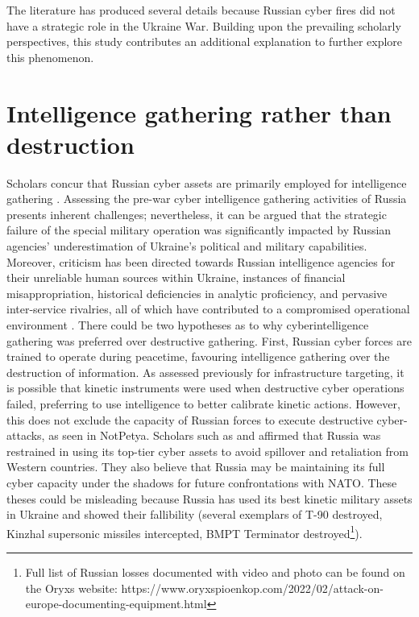 The literature has produced several details because Russian cyber fires did not have a strategic role in the Ukraine War. Building upon the prevailing scholarly perspectives, this study contributes an additional explanation to further explore this phenomenon.

\section{Intelligence gathering rather than destruction}

Scholars concur that Russian cyber assets are primarily employed for intelligence gathering \parencite{baetman_2022_russias, levite_2023_integrating, beecroft_2022_evaluating, lin_2022_russian}. Assessing the pre-war cyber intelligence gathering activities of Russia presents inherent challenges; nevertheless, it can be argued that the strategic failure of the special military operation was significantly impacted by Russian agencies' underestimation of Ukraine's political and military capabilities. Moreover, criticism has been directed towards Russian intelligence agencies for their unreliable human sources within Ukraine, instances of financial misappropriation, historical deficiencies in analytic proficiency, and pervasive inter-service rivalries, all of which have contributed to a compromised operational environment \autocite{baetman_2022_russias}. There could be two hypotheses as to why cyberintelligence gathering was preferred over destructive gathering. First, Russian cyber forces are trained to operate during peacetime, favouring intelligence gathering over the destruction of information. As assessed previously for infrastructure targeting, it is possible that kinetic instruments were used when destructive cyber operations failed, preferring to use intelligence to better calibrate kinetic actions. However, this does not exclude the capacity of Russian forces to execute destructive cyber-attacks, as seen in NotPetya. Scholars such as \textcite{lin_2022_russian} and \textcite{levite_2023_integrating} affirmed that Russia was restrained in using its top-tier cyber assets to avoid spillover and retaliation from Western countries. They also believe that Russia may be maintaining its full cyber capacity under the shadows for future confrontations with NATO. These theses could be misleading because Russia has used its best kinetic military assets in Ukraine and showed their fallibility (several exemplars of T-90 destroyed, Kinzhal supersonic missiles intercepted, BMPT Terminator destroyed\footnote{Full list of Russian losses documented with video and photo can be found on the Oryxs website: https://www.oryxspioenkop.com/2022/02/attack-on-europe-documenting-equipment.html}).

